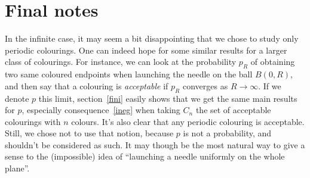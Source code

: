 \documentclass[a4paper,11pt]{article}
\theoremstyle{definition}
\theoremstyle{remark}
\begin{document}
\section{Final notes}
In the infinite case, it may seem a bit disappointing that we chose to study 
only periodic colourings. One can indeed hope for some similar results for a 
larger class of colourings. For instance, we can look at the probability $p_R$ 
of obtaining two same coloured endpoints when launching the needle on the ball 
$B(0,R)$, and then say that a colouring is \emph{acceptable} if $p_R$ converges 
as $R \rightarrow \infty$. If we denote $p$ this limit, section~\ref{fini} 
easily shows that we get the same main results for $p$, especially
consequence~\ref{ineg} when taking $C_n$ the set of acceptable colourings with $n$ colours. 
It's also clear that any periodic colouring is acceptable. Still, we chose not 
to use that notion, because $p$ is not a probability, and shouldn't be 
considered as such. It may though be the most natural way to give a sense to 
the (impossible) idea of ``launching a needle uniformly on the whole plane''.
\end{document}

